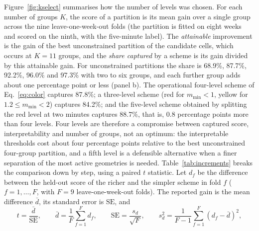 \documentclass[aerospace,article,submit,moreauthors]{Definitions/mdpi}
\newcommand{\mmin}{m_{\min}}
\begin{document}
Figure~\ref{fig:kselect} summarises how the number of levels was chosen. For each number of groups $K$, the score of a partition is its mean gain over a single group across the nine leave-one-week-out folds (the partition is fitted on eight weeks and scored on the ninth, with the five-minute label). The \emph{attainable} improvement is the gain of the best unconstrained partition of the candidate cells, which occurs at $K=11$ groups, and the \emph{share captured} by a scheme is its gain divided by this attainable gain. For unconstrained partitions the share is 68.9\%, 87.7\%, 92.2\%, 96.0\% and 97.3\% with two to six groups, and each further group adds about one percentage point or less (panel b). The operational four-level scheme of Eq.~\eqref{eq:color} captures 87.8\%; a three-level scheme (red for $\mmin<1$, yellow for $1.2\le\mmin<2$) captures 84.2\%; and the five-level scheme obtained by splitting the red level at two minutes captures 88.7\%, that is, 0.8 percentage points more than four levels. Four levels are therefore a compromise between captured score, interpretability and number of groups, not an optimum: the interpretable thresholds cost about four percentage points relative to the best unconstrained four-group partition, and a fifth level is a defensible alternative when a finer separation of the most active geometries is needed. Table~\ref{tab:increments} breaks the comparison down by step, using a paired $t$ statistic. Let $d_f$ be the difference between the held-out score of the richer and the simpler scheme in fold $f$ ($f=1,\dots,F$, with $F=9$ leave-one-week-out folds). The reported gain is the mean difference $\bar d$, its standard error is $\mathrm{SE}$, and
\begin{equation}\label{eq:tstat}
 t=\frac{\bar d}{\mathrm{SE}},\qquad \bar d=\frac1F\sum_{f=1}^{F}d_f,\qquad \mathrm{SE}=\frac{s_d}{\sqrt F},\qquad s_d^2=\frac1{F-1}\sum_{f=1}^{F}\left(d_f-\bar d\right)^2 ,
\end{equation}
\end{document}

